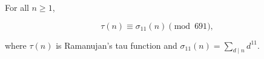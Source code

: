 For all $n \geq 1$,

$$\tau(n) \equiv \sigma_{11}(n) \pmod{691},$$

where $\tau(n)$ is Ramanujan's tau function and $\sigma_{11}(n) = \sum_{d \mid n} d^{11}$.
